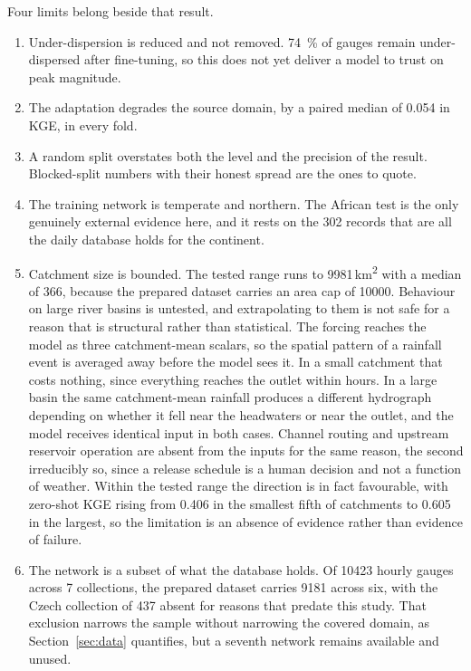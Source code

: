 \documentclass[11pt,a4paper]{article}
\begin{document}
Four limits belong beside that result.
\begin{enumerate}
  \item Under-dispersion is reduced and not removed. \SI{74}{\percent} of gauges remain under-dispersed after fine-tuning, so this does not yet deliver a model to trust on peak magnitude.
  \item The adaptation degrades the source domain, by a paired median of \num{0.054} in KGE, in every fold.
  \item A random split overstates both the level and the precision of the result. Blocked-split numbers with their honest spread are the ones to quote.
  \item The training network is temperate and northern. The African test is the only genuinely external evidence here, and it rests on the \num{302} records that are all the daily database holds for the continent.
  \item Catchment size is bounded. The tested range runs to \num{9981}\,\si{\km\squared} with a median of \num{366}, because the prepared dataset carries an area cap of \num{10000}. Behaviour on large river basins is untested, and extrapolating to them is not safe for a reason that is structural rather than statistical. The forcing reaches the model as three catchment-mean scalars, so the spatial pattern of a rainfall event is averaged away before the model sees it. In a small catchment that costs nothing, since everything reaches the outlet within hours. In a large basin the same catchment-mean rainfall produces a different hydrograph depending on whether it fell near the headwaters or near the outlet, and the model receives identical input in both cases. Channel routing and upstream reservoir operation are absent from the inputs for the same reason, the second irreducibly so, since a release schedule is a human decision and not a function of weather. Within the tested range the direction is in fact favourable, with zero-shot KGE rising from \num{0.406} in the smallest fifth of catchments to \num{0.605} in the largest, so the limitation is an absence of evidence rather than evidence of failure.
  \item The network is a subset of what the database holds. Of \num{10423} hourly gauges across 7 collections, the prepared dataset carries \num{9181} across six, with the Czech collection of \num{437} absent for reasons that predate this study. That exclusion narrows the sample without narrowing the covered domain, as Section~\ref{sec:data} quantifies, but a seventh network remains available and unused.
\end{enumerate}
\end{document}
